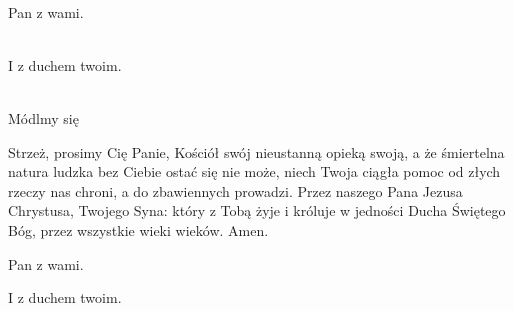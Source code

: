 \newcommand{\dominusvobiscum}{
  \rubric{\Vbar}Pan z wami.
}
\newcommand{\etcumspiritutuo}{
  \rubric{\Rbar}I z duchem twoim.
}

\\
\dominusvobiscum
\\
\etcumspiritutuo
\\
Módlmy się

Strzeż, prosimy Cię Panie, Kościół swój nieustanną opieką swoją, a że śmiertelna natura ludzka bez Ciebie ostać się nie może, niech Twoja ciągła pomoc od złych rzeczy nas chroni, a do zbawiennych prowadzi. Przez naszego Pana Jezusa Chrystusa, Twojego Syna: który z Tobą żyje i króluje w jedności Ducha Świętego Bóg, przez wszystkie wieki wieków. \rubric{\Rbar} Amen.

\dominusvobiscum

\etcumspiritutuo
